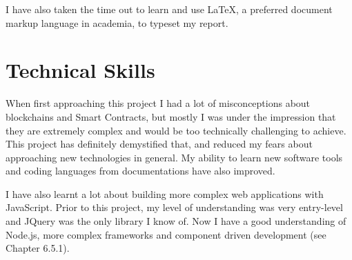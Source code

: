 I have also taken the time out to learn and use LaTeX, a preferred document markup language in academia, 
to typeset my report.

\section{Technical Skills}

When first approaching this project I had a lot of misconceptions about blockchains and Smart Contracts, 
but mostly I was under the impression that they are extremely complex and would be too technically challenging to achieve. 
This project has definitely demystified that, and reduced my fears about approaching new technologies in general.
My ability to learn new software tools and coding languages from documentations have also improved.

I have also learnt a lot about building more complex web applications with JavaScript. Prior to this project, 
my level of understanding was very entry-level and JQuery was the only library I know of. Now I have a good understanding of
Node.js, more complex frameworks and component driven development (see Chapter 6.5.1).